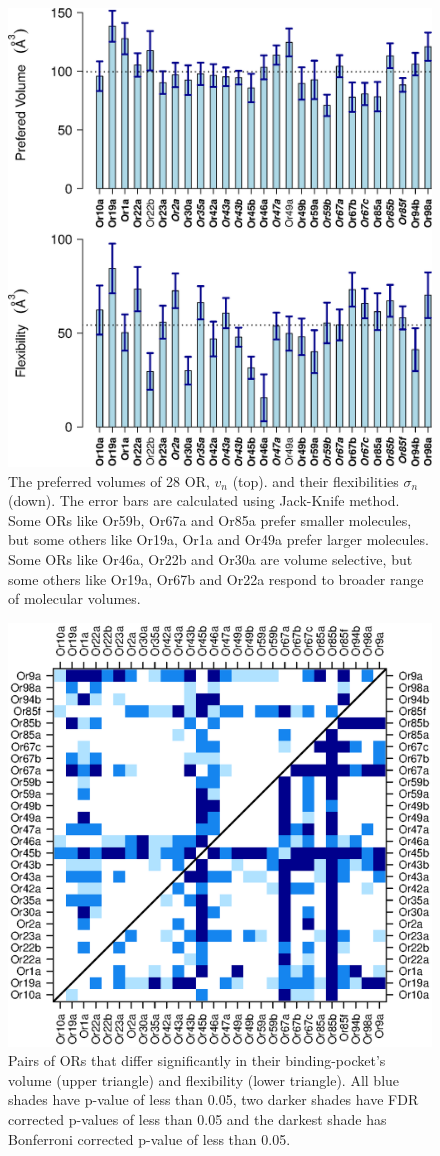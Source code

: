 \documentclass[11pt]{paper} %
\newcommand{\numberofreceptors}{ 28 }
\begin{document}
\begin{figure}
		\centering
		\includegraphics[width= 0.85  \textwidth]{vol-mean-std}
	\caption{The preferred volumes of \numberofreceptors OR, $v_n$ (top). 
		and their flexibilities $\sigma_n$ (down). 
		The error bars are calculated using Jack-Knife method. 
		Some ORs like Or59b, Or67a and  Or85a prefer smaller molecules, 
		but some others like Or19a,  Or1a and  Or49a prefer larger molecules.
		Some ORs like Or46a,  Or22b and Or30a are volume  selective, 
		but some others like Or19a,  Or67b and  Or22a respond to broader range of molecular volumes.
		}
		\label{fig:preferred_volume}
\end{figure}


\begin{figure}
	\centering
	\includegraphics[width= 0.75 \textwidth]{pair-pval}
	\caption{Pairs of ORs that differ significantly in their binding-pocket's volume (upper triangle) and flexibility (lower triangle).
			All blue shades have p-value of less than 0.05, 
			two darker shades have FDR corrected p-values of less than 0.05 and the darkest shade has Bonferroni corrected p-value of less than 0.05.}
	\label{fig:p-values}
\end{figure}
\end{document}
